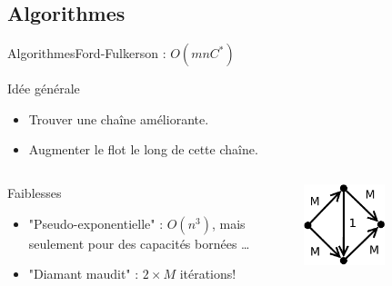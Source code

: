 \subsection{Algorithmes}
\begin{frame}{Algorithmes}{Ford-Fulkerson : $O(mnC^*)$}

\begin{block}{Idée générale}
\begin{itemize}
\item Trouver une chaîne améliorante.
\item Augmenter le flot le long de cette chaîne.
\end{itemize}
\end{block}

\begin{columns}
  \begin{column}[l]{0.6\textwidth}
\begin{block}{Faiblesses}
\begin{itemize}
\item "Pseudo-exponentielle" : $O(n^3)$, mais seulement pour des capacités bornées \ldots
\item "Diamant maudit" : $2\times{M}$ itérations! 
\end{itemize}
\end{block}
\end{column}
\begin{column}[l]{0.4\textwidth}
\includegraphics[width=0.5\textwidth]{img/maudit}
\end{column}
\end{columns}

\end{frame}
